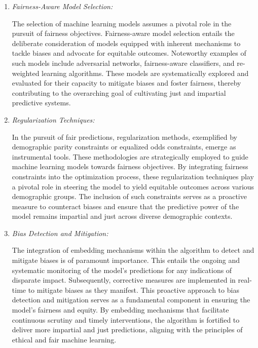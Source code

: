 \documentclass[12pt,a4paper,openright,twoside]{book}
\begin{document}
\begin{enumerate}

    \item \emph{Fairness-Aware Model Selection:} 
    
    The selection of machine learning models assumes a pivotal role in the pursuit of fairness objectives. Fairness-aware model selection entails the deliberate consideration of models equipped with inherent mechanisms to tackle biases and advocate for equitable outcomes. Noteworthy examples of such models include adversarial networks, fairness-aware classifiers, and re-weighted learning algorithms. These models are systematically explored and evaluated for their capacity to mitigate biases and foster fairness, thereby contributing to the overarching goal of cultivating just and impartial predictive systems.
    
    \item \emph{Regularization Techniques:} 
    
    In the pursuit of fair predictions, regularization methods, exemplified by demographic parity constraints or equalized odds constraints, emerge as instrumental tools. These methodologies are strategically employed to guide machine learning models towards fairness objectives. By integrating fairness constraints into the optimization process, these regularization techniques play a pivotal role in steering the model to yield equitable outcomes across various demographic groups. The inclusion of such constraints serves as a proactive measure to counteract biases and ensure that the predictive power of the model remains impartial and just across diverse demographic contexts.

    \item \emph{Bias Detection and Mitigation:} 
    
    The integration of embedding mechanisms within the algorithm to detect and mitigate biases is of paramount importance. This entails the ongoing and systematic monitoring of the model's predictions for any indications of disparate impact. Subsequently, corrective measures are implemented in real-time to mitigate biases as they manifest. This proactive approach to bias detection and mitigation serves as a fundamental component in ensuring the model's fairness and equity. By embedding mechanisms that facilitate continuous scrutiny and timely interventions, the algorithm is fortified to deliver more impartial and just predictions, aligning with the principles of ethical and fair machine learning.


\end{enumerate}
\end{document}
